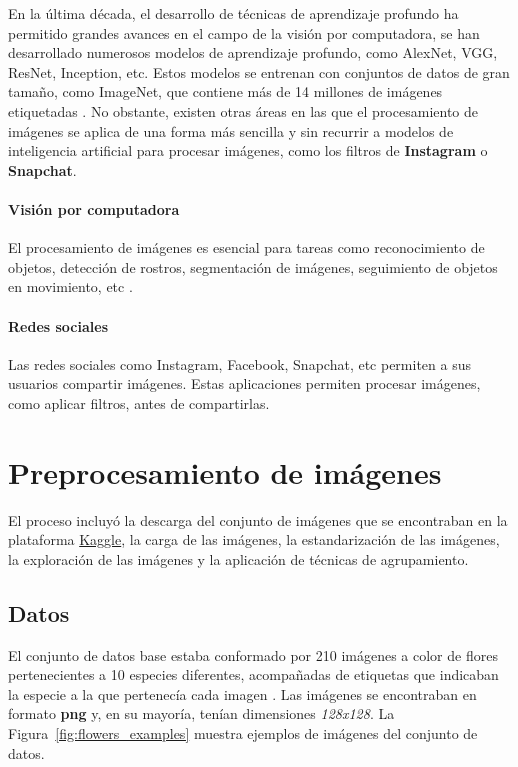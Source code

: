 \documentclass{article}
\begin{document}
En la última década, el desarrollo de técnicas de aprendizaje profundo ha permitido grandes avances en el campo de la visión por computadora, se han desarrollado numerosos modelos de aprendizaje profundo, como AlexNet, VGG, ResNet, Inception, etc. Estos modelos se entrenan con conjuntos de datos de gran tamaño, como ImageNet, que contiene más de 14 millones de imágenes etiquetadas \cite{HandsonML, NEURIPS2021_6d9cb7de}. No obstante, existen otras áreas en las que el procesamiento de imágenes se aplica de una forma más sencilla y sin recurrir a modelos de inteligencia artificial para procesar imágenes, como los filtros de \textbf{Instagram} o \textbf{Snapchat}.

\paragraph{Visión por computadora}

El procesamiento de imágenes es esencial para tareas como reconocimiento de objetos, detección de rostros, segmentación de imágenes, seguimiento de objetos en movimiento, etc \cite{HandsonML}.

\paragraph{Redes sociales}
Las redes sociales como Instagram, Facebook, Snapchat, etc permiten a sus usuarios compartir imágenes. Estas aplicaciones permiten procesar imágenes, como aplicar filtros, antes de compartirlas.

\section{Preprocesamiento de imágenes}
El proceso incluyó la descarga del conjunto de imágenes que se encontraban en la plataforma \href{https://www.kaggle.com/datasets/olgabelitskaya/flower-color-images}{Kaggle}, la carga de las imágenes, la estandarización de las imágenes, la exploración de las imágenes y la aplicación de técnicas de agrupamiento.


\subsection{Datos}

El conjunto de datos base estaba conformado por 210 imágenes a color de flores pertenecientes a 10 especies diferentes, acompañadas de etiquetas que indicaban la especie a la que pertenecía cada imagen \cite{Kaggle}. Las imágenes se encontraban en formato \textbf{png} y, en su mayoría, tenían dimensiones \textit{128x128}. La Figura~\ref{fig:flowers_examples} muestra ejemplos de imágenes del conjunto de datos.
\end{document}
